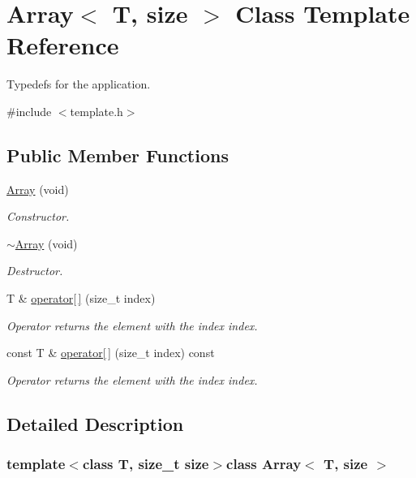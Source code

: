 \hypertarget{class_array}{\section{Array$<$ T, size $>$ Class Template Reference}
\label{d5/d21/class_array}
}


Typedefs for the application.  




{\ttfamily \#include $<$template.\-h$>$}

\subsection*{Public Member Functions}
\begin{DoxyCompactItemize}
\item 
\hyperlink{class_array_a5d56635d68d5e232ea1add891e5c6011}{Array} (void)
\begin{DoxyCompactList}\small\item\em Constructor. \end{DoxyCompactList}\item 
\hyperlink{class_array_a1a856ee487a0ba2fad309e234294f4f2}{$\sim$\-Array} (void)
\begin{DoxyCompactList}\small\item\em Destructor. \end{DoxyCompactList}\item 
T \& \hyperlink{class_array_a2cfcb63e168f5187ffb9d8e97f1d683e}{operator\mbox{[}$\,$\mbox{]}} (size\-\_\-t index)
\begin{DoxyCompactList}\small\item\em Operator returns the element with the index index. \end{DoxyCompactList}\item 
const T \& \hyperlink{class_array_ac2ed5d806f049cd35819ac8d6e5bada2}{operator\mbox{[}$\,$\mbox{]}} (size\-\_\-t index) const 
\begin{DoxyCompactList}\small\item\em Operator returns the element with the index index. \end{DoxyCompactList}\end{DoxyCompactItemize}


\subsection{Detailed Description}
\subsubsection*{template$<$class T, size\-\_\-t size$>$class Array$<$ T, size $>$}

